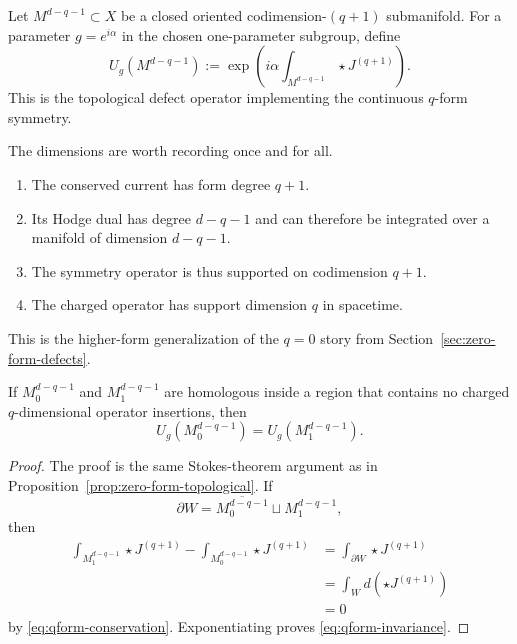 \begin{definition}\label{def:qform-defect}
Let $M^{d-q-1}\subset X$ be a closed oriented codimension-$(q+1)$ submanifold. For a parameter $g=e^{i\alpha}$ in the chosen one-parameter subgroup, define
\begin{equation}\label{eq:Uq-general}
U_g(M^{d-q-1})
:=
\exp\!\left(i\alpha\int_{M^{d-q-1}}\star J^{(q+1)}\right).
\end{equation}
This is the topological defect operator implementing the continuous $q$-form symmetry.
\end{definition}

\begin{remark}\label{rem:qform-dimensions}
The dimensions are worth recording once and for all.
\begin{enumerate}
\item The conserved current has form degree $q+1$.
\item Its Hodge dual has degree $d-q-1$ and can therefore be integrated over a manifold of dimension $d-q-1$.
\item The symmetry operator is thus supported on codimension $q+1$.
\item The charged operator has support dimension $q$ in spacetime.
\end{enumerate}
This is the higher-form generalization of the $q=0$ story from Section~\ref{sec:zero-form-defects}.
\end{remark}

\begin{proposition}\label{prop:qform-topological}
If $M_0^{d-q-1}$ and $M_1^{d-q-1}$ are homologous inside a region that contains no charged $q$-dimensional operator insertions, then
\begin{equation}\label{eq:qform-invariance}
U_g(M_0^{d-q-1})=U_g(M_1^{d-q-1}).
\end{equation}
\end{proposition}

\begin{proof}
The proof is the same Stokes-theorem argument as in Proposition~\ref{prop:zero-form-topological}. If
\begin{equation*}
\partial W=\overline{M_0^{d-q-1}}\sqcup M_1^{d-q-1},
\end{equation*}
then
\begin{align*}
\int_{M_1^{d-q-1}}\star J^{(q+1)}-\int_{M_0^{d-q-1}}\star J^{(q+1)}
&=
\int_{\partial W}\star J^{(q+1)} \\
&=
\int_W d(\star J^{(q+1)}) \\
&= 0
\end{align*}
by \eqref{eq:qform-conservation}. Exponentiating proves \eqref{eq:qform-invariance}.
\end{proof}

